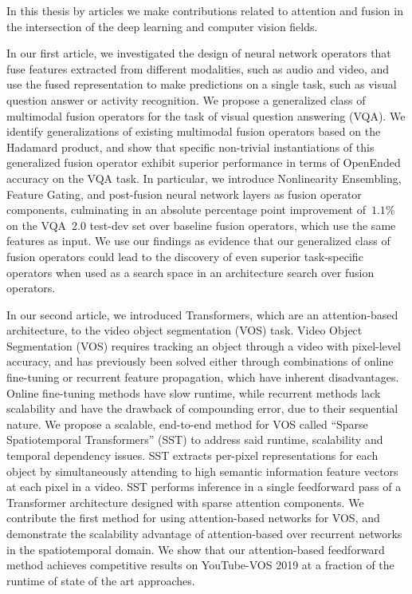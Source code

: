 In this thesis by articles we make contributions related to attention and
fusion in the intersection of the deep learning and computer vision fields.

In our first article, we investigated the design of neural network operators
that fuse features extracted from different modalities, such as audio and
video, and use the fused representation to make predictions on a single task,
such as visual question answer or activity recognition.
We propose a generalized class of multimodal fusion operators for the task of
visual question answering (VQA).
We identify generalizations of existing multimodal fusion operators based on
the Hadamard product, and show that specific non-trivial instantiations of this
generalized fusion operator exhibit superior performance in terms of OpenEnded
accuracy on the VQA task.
In particular, we introduce Nonlinearity Ensembling, Feature Gating, and
post-fusion neural network layers as fusion operator components, culminating in
an absolute percentage point improvement of~$1.1\%$ on the VQA~2.0 test-dev set
over baseline fusion operators, which use the same features as input.
We use our findings as evidence that our generalized class of fusion operators
could lead to the discovery of even superior task-specific operators when used
as a search space in an architecture search over fusion operators.

In our second article, we introduced Transformers, which are an attention-based
architecture, to the video object segmentation (VOS) task.
Video Object Segmentation (VOS) requires tracking an object through a video
with pixel-level accuracy, and has previously been solved either through
combinations of online fine-tuning or recurrent feature propagation, which have
inherent disadvantages.
Online fine-tuning methods have slow runtime, while recurrent methods lack
scalability and have the drawback of compounding error, due to their sequential
nature.
We propose a scalable, end-to-end method for VOS called
``Sparse Spatiotemporal Transformers'' (SST) to address said runtime,
scalability and temporal dependency issues.
SST extracts per-pixel representations for each object by simultaneously
attending to high semantic information feature vectors at each pixel in a
video.
SST performs inference in a single feedforward pass of a Transformer
architecture designed with sparse attention components.
We contribute the first method for using attention-based networks for VOS, and
demonstrate the scalability advantage of attention-based over recurrent
networks in the spatiotemporal domain.
We show that our attention-based feedforward method achieves competitive
results on YouTube-VOS 2019 at a fraction of the runtime of state of the art
approaches.
